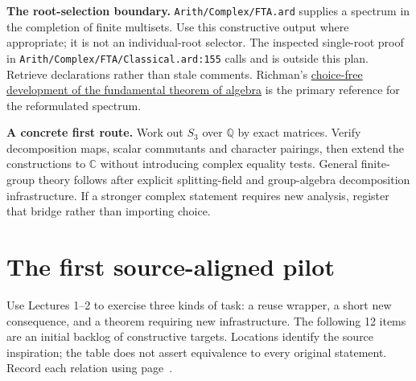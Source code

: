 \documentclass[11pt,a4paper]{article}
\newcommand{\code}[1]{\texttt{\detokenize{#1}}}
\newcommand{\src}[1]{{\footnotesize\nolinkurl{#1}}}
\newcommand{\C}{\mathbb C}
\newcommand{\Q}{\mathbb Q}
\begin{document}
\textbf{The root-selection boundary.}
\src{Arith/Complex/FTA.ard} supplies a spectrum in the completion of finite
multisets. Use this constructive output where appropriate; it is not an
individual-root selector. The inspected single-root proof in
\src{Arith/Complex/FTA/Classical.ard:155} calls \code{acchoice} and is outside
this plan. Retrieve declarations rather than stale \code{FTA.Choice} comments.
Richman's \href{https://msp.org/pjm/2000/196-1/pjm-v196-n1-p10-p.pdf}
{choice-free development of the fundamental theorem of algebra}
is the primary reference for the reformulated spectrum.

\textbf{A concrete first route.} Work out $S_3$ over $\Q$ by exact matrices.
Verify decomposition maps, scalar commutants and character pairings, then
extend the constructions to $\C$ without introducing complex equality tests.
General finite-group theory follows after explicit splitting-field and
group-algebra decomposition infrastructure. If a stronger complex statement
requires new analysis, register that bridge rather than importing choice.

\newpage
\section{The first source-aligned pilot}\label{sec:pilot}
Use Lectures 1--2 to exercise three kinds of task: a reuse wrapper, a short
new consequence, and a theorem requiring new infrastructure. The following
12 items are an initial backlog of constructive targets. Locations identify
the source inspiration; the table does not assert equivalence to every
original statement. Record each relation using page~\pageref{sec:replacements}.
\end{document}
